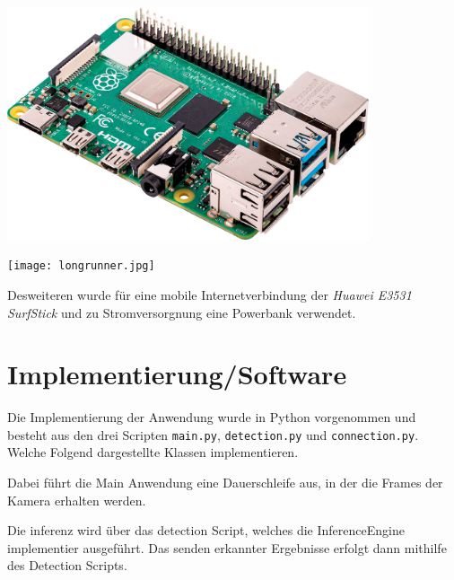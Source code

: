 \begin{minipage}{0.55\textwidth}
    \centering
    \includegraphics[width=0.8\textwidth]{./Bilder/raspberrypi_4.png}
    \label{img:raspberrypi}
\end{minipage}
\begin{minipage}{0.45\textwidth}
    \centering
    \texttt{[image: longrunner.jpg]}
    \label{fig:rpicam}
\end{minipage}
\vspace{0.6cm}


Desweiteren wurde für eine mobile Internetverbindung 
der \textit{Huawei E3531 SurfStick} und zu Stromversorgnung
eine Powerbank verwendet.




\section{Implementierung/Software}

Die Implementierung der Anwendung wurde in Python vorgenommen und 
besteht aus den drei Scripten \texttt{main.py}, \texttt{detection.py}
und \texttt{connection.py}. Welche Folgend dargestellte Klassen 
implementieren.

\vspace{1cm}

\vspace{1cm}

Dabei führt die Main Anwendung eine Dauerschleife aus, in der 
die Frames der Kamera erhalten werden. 

Die inferenz wird über das detection Script, welches die 
InferenceEngine implementier ausgeführt.
Das senden erkannter Ergebnisse erfolgt dann mithilfe 
des Detection Scripts.


